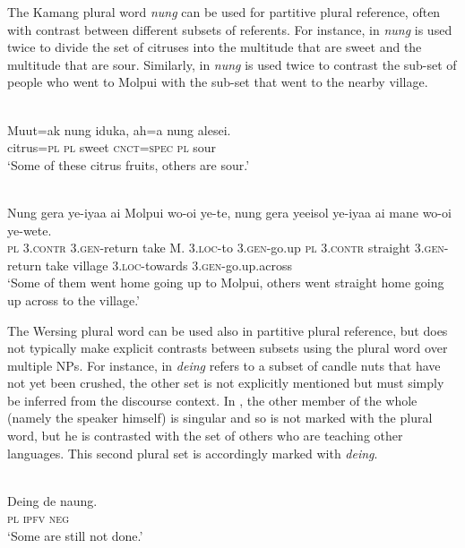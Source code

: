 The Kamang plural word \textit{nung} can be used for partitive plural reference, often with contrast between different subsets of referents. For instance, in  \textit{nung} is used twice to divide the set of citruses into the multitude that are sweet and the multitude that are sour. Similarly, in  \textit{nung} is used twice to contrast the sub-set of people who went to Molpui with the sub-set that went to the nearby village.


\ea%
\label{ex:9:84}
 \\
\gll  Muut=ak nung iduka, ah=a nung alesei. \\
   citrus=\textsc{pl} \textsc{pl} sweet \textsc{cnct=spec} \textsc{pl} sour  \\
\glt `Some of these citrus fruits, others are sour.'
\z







\ea%
\label{ex:9:85}
 \\
\gll  Nung gera ye-iyaa ai Molpui wo-oi ye-te,  nung gera yeeisol ye-iyaa ai  mane wo-oi ye-wete. \\
    \textsc{pl} \textsc{3.contr} \textsc{3.gen}-return take M. 3.\textsc{loc}-to \textsc{3.gen}-go.up  \textsc{pl} \textsc{3.contr} straight \textsc{3.gen}-return take  village 3.\textsc{loc}-towards \textsc{3.gen}-go.up.across \\
\glt `Some of them went home going up to Molpui, others went straight home going up across to the village.'
\z




The Wersing plural word can be used also in partitive plural reference, but does not typically make explicit contrasts between subsets using the plural word over multiple NPs. For instance, in  \textit{deing} refers to a subset of candle nuts that have not yet been crushed, the other set is not explicitly mentioned but must simply be inferred from the discourse context. In , the other member of the whole (namely the speaker himself) is singular and so is not marked with the plural word, but he is contrasted with the set of others who are teaching other languages. This second plural set is accordingly marked with \textit{deing}.


\ea%
\label{ex:9:86}
 \\
\gll Deing de naung. \\
 \textsc{pl} \textsc{ipfv} \textsc{neg}   \\
\glt `Some are still not done.'
\z







